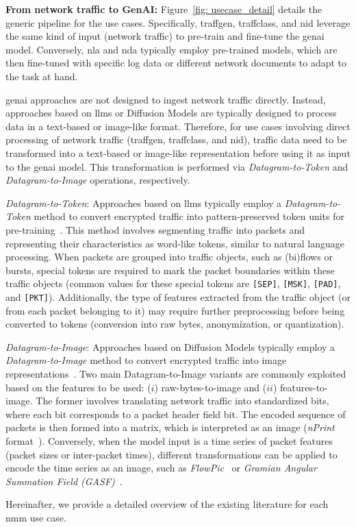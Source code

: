 \vspace{5pt}
\noindent\textbf{From network traffic to GenAI:} 
Figure~\ref{fig: usecase_detail} details the generic pipeline for the use cases.
Specifically, \gls{traffgen}, \gls{traffclass}, and \gls{nid} leverage the same kind of input (\ie network traffic) to pre-train and fine-tune the \gls{genai} model.
Conversely, \gls{nla} and \gls{nda} typically employ pre-trained models, which are then fine-tuned with specific log data or different network documents to adapt to the task at hand.

\gls{genai} approaches are not designed to ingest network traffic directly. Instead, approaches based on \glspl{llm} or Diffusion Models are typically designed to process data in a text-based or image-like format. Therefore, for use cases involving direct processing of network traffic (\ie \gls{traffgen}, \gls{traffclass}, and \gls{nid}), traffic data need to be transformed into a text-based or image-like representation before using it as input to the \gls{genai} model. This transformation is performed via \emph{Datagram-to-Token} and \emph{Datagram-to-Image} operations, respectively.




\vspace{5pt}
\noindent
\emph{Datagram-to-Token}: Approaches based on \glspl{llm} typically employ a \emph{Datagram-to-Token} method to convert encrypted traffic into pattern-preserved token units for pre-training~\cite{lin2022}. 
%
This method involves segmenting traffic into packets and representing their characteristics as word-like tokens, similar to natural language processing. 
When packets are grouped into traffic objects, such as (bi)flows or bursts, special tokens are required to mark the packet boundaries within these traffic objects (\eg common values for these special tokens are \texttt{[SEP]}, \texttt{[MSK]}, \texttt{[PAD]}, and \texttt{[PKT]}). 
Additionally, the type of features extracted from the traffic object (or from each packet belonging to it) may require further preprocessing before being converted to tokens (\eg conversion into raw bytes, anonymization, or quantization).
%


\vspace{5pt}
\noindent
\emph{Datagram-to-Image}: Approaches based on Diffusion Models typically employ a \emph{Datagram-to-Image} method to convert encrypted traffic into image representations~\cite{jiang2024netdiffusion}. 
%
Two main Datagram-to-Image variants are commonly exploited based on the features to be used: 
($i$) raw-bytes-to-image 
and ($ii$) features-to-image. 
The former involves translating network traffic into standardized bits, where each bit corresponds to a packet header field bit. The encoded sequence of packets is then formed into a matrix, which is interpreted as an image (\eg \emph{nPrint} format~\cite{holland2021new}).
Conversely, when the model input is a time series of packet features (\eg packet sizes or inter-packet times), different transformations can be applied to encode the time series as an image, such as \emph{FlowPic}~\cite{shapira2021flowpic} or \emph{Gramian Angular Summation Field (GASF)}~\cite{sivaroopan2023netdiffus}.
%


\vspace{5pt}
Hereinafter, we provide a detailed overview of the existing literature for each \gls{nmm} use case.

